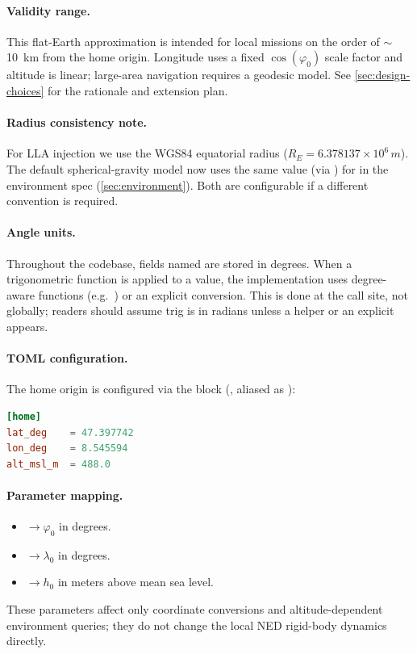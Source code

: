 \paragraph{Validity range.}
This flat-Earth approximation is intended for local missions on the order of \(\sim\)\SI{10}{km} from the home origin. Longitude uses a fixed \(\cos(\varphi_0)\) scale factor and altitude is linear; large-area navigation requires a geodesic model. See \cref{sec:design-choices} for the rationale and extension plan.

\paragraph{Radius consistency note.}
For LLA injection we use the WGS84 equatorial radius (\(R_E=6.378137\times 10^6\,\si{m}\)). The default spherical-gravity model now uses the same value (via ) for  in the environment spec (\cref{sec:environment}). Both are configurable if a different convention is required.

\paragraph{Angle units.}
Throughout the codebase, fields named  are stored in degrees. When a trigonometric function is applied to a  value, the implementation uses degree-aware functions (e.g.\ ) or an explicit  conversion. This is done at the call site, not globally; readers should assume trig is in radians unless a  helper or an explicit  appears.

\paragraph{TOML configuration.}
The home origin is configured via the \code{[home]} block (, aliased as ):

\begin{lstlisting}[language=toml]
[home]
lat_deg    = 47.397742
lon_deg    = 8.545594
alt_msl_m  = 488.0
\end{lstlisting}

\paragraph{Parameter mapping.}
\begin{itemize}[leftmargin=*,itemsep=2pt]
  \item {} \(\rightarrow \varphi_0\) in degrees.
  \item {} \(\rightarrow \lambda_0\) in degrees.
  \item {} \(\rightarrow h_0\) in meters above mean sea level.
\end{itemize}
These parameters affect only coordinate conversions and altitude-dependent environment queries; they do not change the local NED rigid-body dynamics directly.

